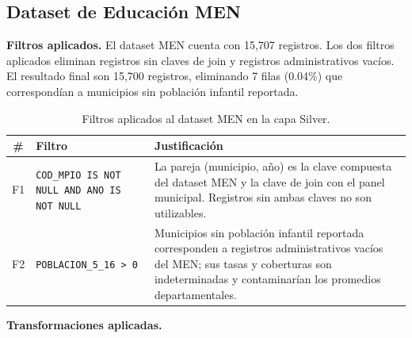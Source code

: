 \subsection{Dataset de Educación MEN}

\textbf{Filtros aplicados.} El dataset MEN cuenta con 15,707 registros. Los dos filtros aplicados eliminan registros sin claves de join y registros administrativos vacíos. El resultado final son 15,700 registros, eliminando 7 filas (0.04\%) que correspondían a municipios sin población infantil reportada.

\begin{table}[H]
\centering
\caption{Filtros aplicados al dataset MEN en la capa Silver.}
\begin{tabularx}{\textwidth}{c l X}
\toprule
\textbf{\#} & \textbf{Filtro} & \textbf{Justificación} \\
\midrule
F1 & \texttt{COD\_MPIO IS NOT NULL AND ANO IS NOT NULL} & La pareja (municipio, año) es la clave compuesta del dataset MEN y la clave de join con el panel municipal. Registros sin ambas claves no son utilizables. \\
F2 & \texttt{POBLACION\_5\_16 > 0} & Municipios sin población infantil reportada corresponden a registros administrativos vacíos del MEN; sus tasas y coberturas son indeterminadas y contaminarían los promedios departamentales. \\
\bottomrule
\end{tabularx}
\end{table}

\textbf{Transformaciones aplicadas.}


